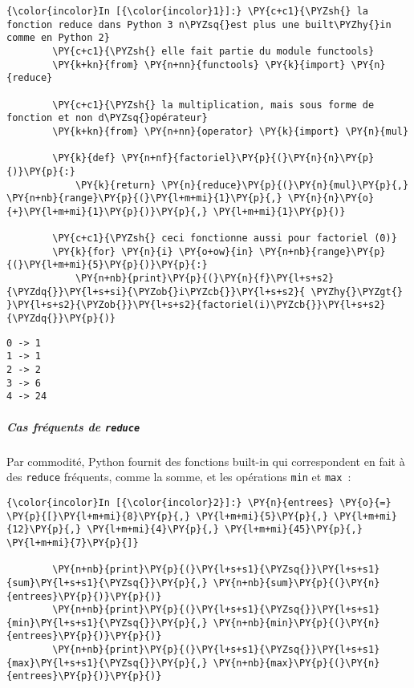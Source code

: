     \begin{Verbatim}[commandchars=\\\{\},frame=single,framerule=0.3mm,rulecolor=\color{cellframecolor}]
{\color{incolor}In [{\color{incolor}1}]:} \PY{c+c1}{\PYZsh{} la fonction reduce dans Python 3 n\PYZsq{}est plus une built\PYZhy{}in comme en Python 2}
        \PY{c+c1}{\PYZsh{} elle fait partie du module functools}
        \PY{k+kn}{from} \PY{n+nn}{functools} \PY{k}{import} \PY{n}{reduce}
        
        \PY{c+c1}{\PYZsh{} la multiplication, mais sous forme de fonction et non d\PYZsq{}opérateur}
        \PY{k+kn}{from} \PY{n+nn}{operator} \PY{k}{import} \PY{n}{mul}
        
        \PY{k}{def} \PY{n+nf}{factoriel}\PY{p}{(}\PY{n}{n}\PY{p}{)}\PY{p}{:}
            \PY{k}{return} \PY{n}{reduce}\PY{p}{(}\PY{n}{mul}\PY{p}{,} \PY{n+nb}{range}\PY{p}{(}\PY{l+m+mi}{1}\PY{p}{,} \PY{n}{n}\PY{o}{+}\PY{l+m+mi}{1}\PY{p}{)}\PY{p}{,} \PY{l+m+mi}{1}\PY{p}{)}
        
        \PY{c+c1}{\PYZsh{} ceci fonctionne aussi pour factoriel (0)}
        \PY{k}{for} \PY{n}{i} \PY{o+ow}{in} \PY{n+nb}{range}\PY{p}{(}\PY{l+m+mi}{5}\PY{p}{)}\PY{p}{:}
            \PY{n+nb}{print}\PY{p}{(}\PY{n}{f}\PY{l+s+s2}{\PYZdq{}}\PY{l+s+si}{\PYZob{}i\PYZcb{}}\PY{l+s+s2}{ \PYZhy{}\PYZgt{} }\PY{l+s+s2}{\PYZob{}}\PY{l+s+s2}{factoriel(i)\PYZcb{}}\PY{l+s+s2}{\PYZdq{}}\PY{p}{)}
\end{Verbatim}


    \begin{Verbatim}[commandchars=\\\{\},frame=single,framerule=0.3mm,rulecolor=\color{cellframecolor}]
0 -> 1
1 -> 1
2 -> 2
3 -> 6
4 -> 24
\end{Verbatim}

    \hypertarget{cas-fruxe9quents-de-reduce}{%
\subparagraph{\texorpdfstring{Cas fréquents de
\texttt{reduce}}{Cas fréquents de reduce}}\label{cas-fruxe9quents-de-reduce}}

    Par commodité, Python fournit des fonctions built-in qui correspondent
en fait à des \texttt{reduce} fréquents, comme la somme, et les
opérations \texttt{min} et \texttt{max}~:

    \begin{Verbatim}[commandchars=\\\{\},frame=single,framerule=0.3mm,rulecolor=\color{cellframecolor}]
{\color{incolor}In [{\color{incolor}2}]:} \PY{n}{entrees} \PY{o}{=} \PY{p}{[}\PY{l+m+mi}{8}\PY{p}{,} \PY{l+m+mi}{5}\PY{p}{,} \PY{l+m+mi}{12}\PY{p}{,} \PY{l+m+mi}{4}\PY{p}{,} \PY{l+m+mi}{45}\PY{p}{,} \PY{l+m+mi}{7}\PY{p}{]}
        
        \PY{n+nb}{print}\PY{p}{(}\PY{l+s+s1}{\PYZsq{}}\PY{l+s+s1}{sum}\PY{l+s+s1}{\PYZsq{}}\PY{p}{,} \PY{n+nb}{sum}\PY{p}{(}\PY{n}{entrees}\PY{p}{)}\PY{p}{)}
        \PY{n+nb}{print}\PY{p}{(}\PY{l+s+s1}{\PYZsq{}}\PY{l+s+s1}{min}\PY{l+s+s1}{\PYZsq{}}\PY{p}{,} \PY{n+nb}{min}\PY{p}{(}\PY{n}{entrees}\PY{p}{)}\PY{p}{)}
        \PY{n+nb}{print}\PY{p}{(}\PY{l+s+s1}{\PYZsq{}}\PY{l+s+s1}{max}\PY{l+s+s1}{\PYZsq{}}\PY{p}{,} \PY{n+nb}{max}\PY{p}{(}\PY{n}{entrees}\PY{p}{)}\PY{p}{)}
\end{Verbatim}


